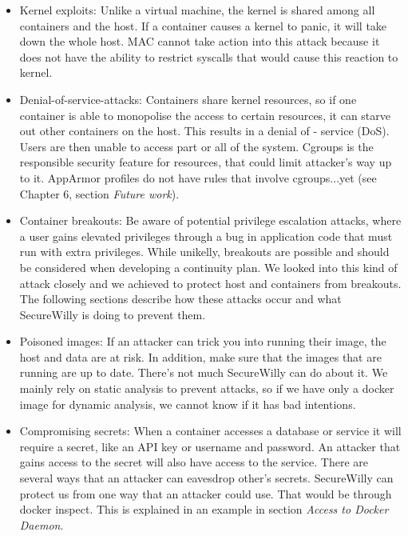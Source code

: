 \begin{itemize}
\item Kernel exploits: Unlike a virtual machine, the kernel is shared among all containers and the host. If a container causes a kernel to panic, it will take down the whole host.
MAC cannot take action into this attack because it does not have the ability to restrict syscalls that would cause this reaction to kernel.

\item Denial-of-service-attacks: Containers share kernel resources, so if one container is able to monopolise the access to certain resources, it can starve out other containers on the host. This results in a denial of - service (DoS). Users are then unable to access part or all of the system.
Cgroups is the responsible security feature for resources, that could limit attacker's way up to it. AppArmor profiles do not have rules that involve cgroups...yet (see Chapter 6, section \textit{Future work}).

\item Container breakouts: Be aware of potential privilege escalation attacks, where a user gains elevated privileges through a bug in application code that must run with extra privileges. While unikelly, breakouts are possible and should be considered  when developing a continuity plan.
We looked into this kind of attack closely and we achieved to protect host and containers from breakouts. The following sections describe how these attacks occur and what SecureWilly is doing to prevent them.

\item Poisoned images: If an attacker can trick you into running their image, the host and data are at risk. In addition, make sure that the images that are running are up to date.
There's not much SecureWilly can do about it. We mainly rely on static analysis to prevent attacks, so if we have only a docker image for dynamic analysis, we cannot know if it has bad intentions.

\item Compromising secrets: When a container accesses a database or service it will require a secret, like an API key or username and password. An attacker that gains access to the secret will also have access to the service.
There are several ways that an attacker can eavesdrop other's secrets. SecureWilly can protect us from one way that an attacker could use. That would be through docker inspect. This is explained in an example in section \textit{Access to Docker Daemon}.

\end{itemize}

